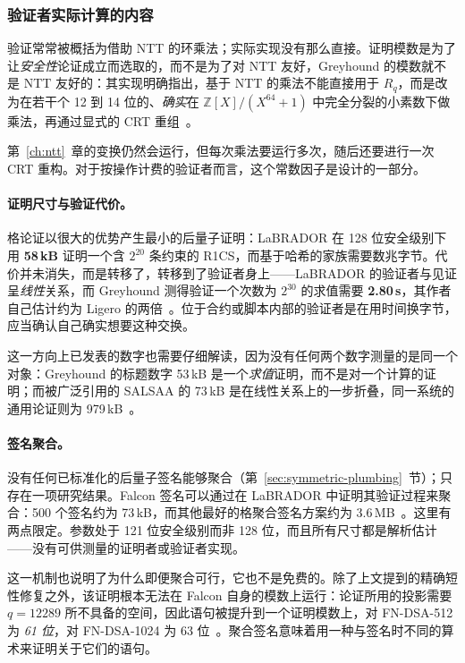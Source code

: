 \subsubsection{验证者实际计算的内容}
验证常常被概括为借助 NTT 的环乘法；实际实现没有那么直接。证明模数是为了让\emph{安全性}论证成立而选取的，而不是为了对 NTT 友好，Greyhound 的模数就不是 NTT 友好的：其实现明确指出，基于 NTT 的乘法不能直接用于 $R_q$，而是改为在若干个 12 到 14 位的、\emph{确实}在 $\mathbb{Z}[X]/(X^{64}+1)$ 中完全分裂的小素数下做乘法，再通过显式的 CRT 重组~\cite{greyhound2024}。

第~\ref{ch:ntt}~章的变换仍然会运行，但每次乘法要运行多次，随后还要进行一次 CRT 重构。对于按操作计费的验证者而言，这个常数因子是设计的一部分。

\paragraph{证明尺寸与验证代价。}
格论证以很大的优势产生最小的后量子证明：LaBRADOR 在 128 位安全级别下用 \textbf{58\,kB} 证明一个含 $2^{20}$ 条约束的 R1CS，而基于哈希的家族需要数兆字节。代价并未消失，而是转移了，转移到了验证者身上——LaBRADOR 的验证者与见证呈\emph{线性}关系，而 Greyhound 测得验证一个次数为 $2^{30}$ 的求值需要 \textbf{2.80\,s}，其作者自己估计约为 Ligero 的两倍~\cite{greyhound2024}。位于合约或脚本内部的验证者是在用时间换字节，应当确认自己确实想要这种交换。

这一方向上已发表的数字也需要仔细解读，因为没有任何两个数字测量的是同一个对象：Greyhound 的标题数字 53\,kB 是一个\emph{求值}证明，而不是对一个计算的证明；而被广泛引用的 SALSAA 的 73\,kB 是在线性关系上的一步折叠，同一系统的通用论证则为 979\,kB~\cite{salsaa2025}。

\paragraph{签名聚合。}
没有任何已标准化的后量子签名能够聚合（第~\ref{sec:symmetric-plumbing}~节）；只存在一项研究结果。Falcon 签名可以通过在 LaBRADOR 中证明其验证过程来聚合：500 个签名约为 73\,kB，而其他最好的格聚合签名方案约为 3.6\,MB~\cite{falconagg2024}。这里有两点限定。参数处于 121 位安全级别而非 128 位，而且所有尺寸都是解析估计——没有可供测量的证明者或验证者实现。

这一机制也说明了为什么即便聚合可行，它也不是免费的。除了上文提到的精确短性修复之外，该证明根本无法在 Falcon 自身的模数上运行：论证所用的投影需要 $q=12289$ 所不具备的空间，因此语句被提升到一个证明模数上，对 FN-DSA-512 为 \emph{61 位}，对 FN-DSA-1024 为 63 位~\cite{falconagg2024}。聚合签名意味着用一种与签名时不同的算术来证明关于它们的语句。

